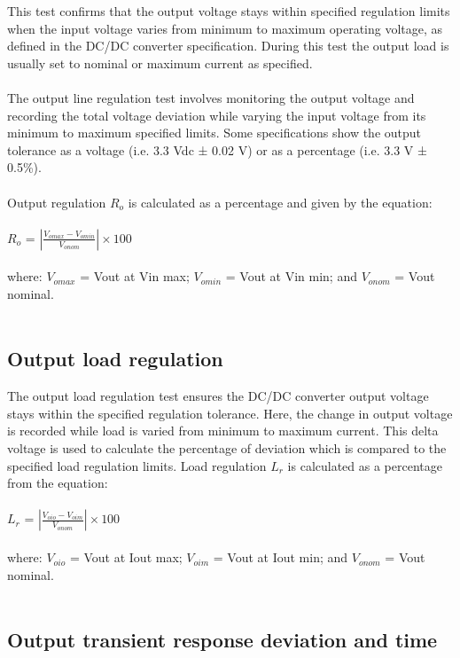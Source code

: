This test confirms that the output voltage stays within specified regulation limits when the input voltage varies from minimum to maximum operating voltage, as defined in the DC/DC converter specification. During this test the output load is usually set to nominal or maximum current as specified.
\\ \\
The output line regulation test involves monitoring the output voltage and recording the total voltage deviation while varying the input voltage from its minimum to maximum specified limits. Some specifications show the output tolerance as a voltage (i.e. 3.3 Vdc ± 0.02 V) or as a percentage (i.e. 3.3 V ± 0.5\%).
\\ \\
Output regulation $R_{o}$ is calculated as a percentage and given by the equation:
\\ \\
\hspace*{5cm}$R_{o}$ = $\left | \frac{V_{omax}-V_{omin}}{V_{onom}} \right | \times 100$
\\ \\
where:
$V_{omax}$ = Vout at Vin max; 
$V_{omin}$ = Vout at Vin min; and
$V_{onom}$ = Vout nominal.
\\ \\
\subsection{Output load regulation} 
The output load regulation test ensures the DC/DC converter output voltage stays within the specified regulation tolerance. Here, the change in output voltage is recorded while load is varied from minimum to maximum current. This delta voltage is used to calculate the percentage of deviation which is compared to the specified load regulation limits. Load regulation $L_{r}$ is calculated as a percentage from the equation:
\\ \\
\hspace*{5cm}$L_{r}$ = $\left | \frac{V_{oio}-V_{oim}}{V_{onom}} \right | \times 100$
\\ \\
where:
$V_{oio}$ = Vout at Iout max; 
$V_{oim}$ = Vout at Iout min; and
$V_{onom}$ = Vout nominal.
\\ \\
\subsection{Output transient response deviation and time}

